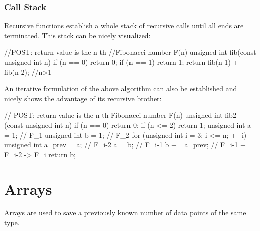 \documentclass[10pt,a4paper]{scrartcl}
\begin{document}
\begin{multicols*}{2}
\subsubsection{Call Stack}
\label{sec:CallStack}

Recursive functions establish a whole stack of recursive calls until all ends are terminated. This stack can be nicely visualized:

\begin{TPCpp}
//POST: return value is the n-th
//Fibonacci number F(n)
unsigned int fib(const unsigned int n){
	if (n == 0) return 0;
	if (n == 1) return 1;
	return fib(n-1) + fib(n-2); //n>1
}
\end{TPCpp}

\begin{center}
\end{center}

An iterative formulation of the above algorithm can also be established and nicely shows the advantage of its recursive brother:

\begin{TPCpp}
// POST: return value is the n-th Fibonacci number F(n)
unsigned int fib2 (const unsigned int n) {
	if (n == 0) return 0;
	if (n <= 2) return 1;
	unsigned int a = 1; // F_1
	unsigned int b = 1; // F_2
	for (unsigned int i = 3; i <= n; ++i) {
		unsigned int a_prev = a; // F_i-2
		a = b; // F_i-1
		b += a_prev; // F_i-1 += F_i-2 -> F_i
	}
	return b;
}
\end{TPCpp}

\section{Arrays}
\label{sec:Arrays}

Arrays are used to save a previously known number of data points of the same type.


\end{multicols*}
\end{document}

